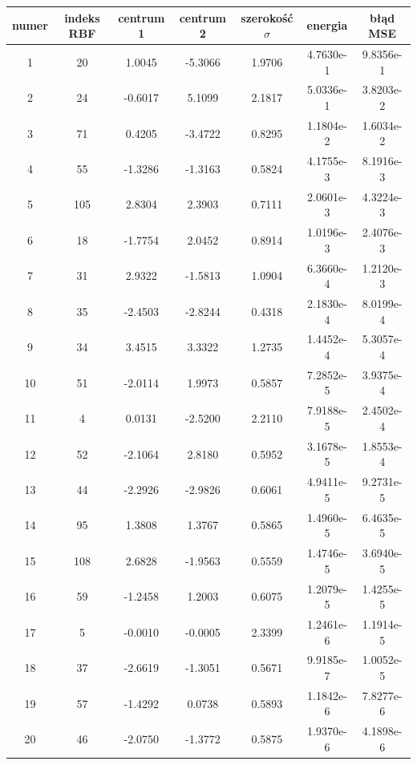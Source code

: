 \begin{table}[ht!]
\centering

\begin{tabular}{ |c| c| c| c| c| c| c| }
\hline
numer & indeks RBF & centrum 1 & centrum 2 & szerokość $\sigma$ & energia      & błąd MSE    \\ \hline    
  1 &  20  &  1.0045 &  -5.3066  &  1.9706 &   4.7630e-1 & 9.8356e-1  \\
  2 &  24  & -0.6017 &   5.1099  &  2.1817 &   5.0336e-1 & 3.8203e-2  \\
  3 &  71  &  0.4205 &  -3.4722  &  0.8295 &   1.1804e-2 & 1.6034e-2  \\
  4 &  55  & -1.3286 &  -1.3163  &  0.5824 &   4.1755e-3 & 8.1916e-3  \\
  5 & 105  &  2.8304 &   2.3903  &  0.7111 &   2.0601e-3 & 4.3224e-3  \\
  6 &  18  & -1.7754 &   2.0452  &  0.8914 &   1.0196e-3 & 2.4076e-3  \\
  7 &  31  &  2.9322 &  -1.5813  &  1.0904 &   6.3660e-4 & 1.2120e-3  \\
  8 &  35  & -2.4503 &  -2.8244  &  0.4318 &   2.1830e-4 & 8.0199e-4  \\
  9 &  34  &  3.4515 &   3.3322  &  1.2735 &   1.4452e-4 & 5.3057e-4  \\
 10 &  51  & -2.0114 &   1.9973  &  0.5857 &   7.2852e-5 & 3.9375e-4  \\
 11 &   4  &  0.0131 &  -2.5200  &  2.2110 &   7.9188e-5 & 2.4502e-4  \\
 12 &  52  & -2.1064 &   2.8180  &  0.5952 &   3.1678e-5 & 1.8553e-4  \\
 13 &  44  & -2.2926 &  -2.9826  &  0.6061 &   4.9411e-5 & 9.2731e-5  \\
 14 &  95  &  1.3808 &   1.3767  &  0.5865 &   1.4960e-5 & 6.4635e-5  \\
 15 & 108  &  2.6828 &  -1.9563  &  0.5559 &   1.4746e-5 & 3.6940e-5  \\
 16 &  59  & -1.2458 &   1.2003  &  0.6075 &   1.2079e-5 & 1.4255e-5  \\
 17 &   5  & -0.0010 &  -0.0005  &  2.3399 &   1.2461e-6 & 1.1914e-5  \\
 18 &  37  & -2.6619 &  -1.3051  &  0.5671 &   9.9185e-7 & 1.0052e-5  \\
 19 &  57  & -1.4292 &   0.0738  &  0.5893 &   1.1842e-6 & 7.8277e-6  \\
 20 &  46  & -2.0750 &  -1.3772  &  0.5875 &   1.9370e-6 & 4.1898e-6  \\

\end{tabular}
\end{table}
